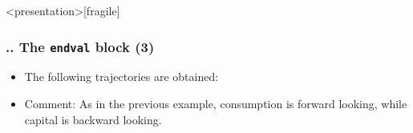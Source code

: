 \documentclass[11pt,aspectratio=169]{beamer}
\begin{document}
\begin{frame}<presentation>[fragile]
	\frametitle{{\thesection.\thesubsection.\thesubsubsection} The \texttt{endval} block (3)}
		\begin{itemize}
		\item The following trajectories are obtained:
		\begin{figure}
			\centering
			\qquad
			\qquad
		\end{figure}
		\item Comment: As in the previous example, consumption is forward looking, while capital is backward looking.
	\end{itemize}
\end{frame}
\end{document}
